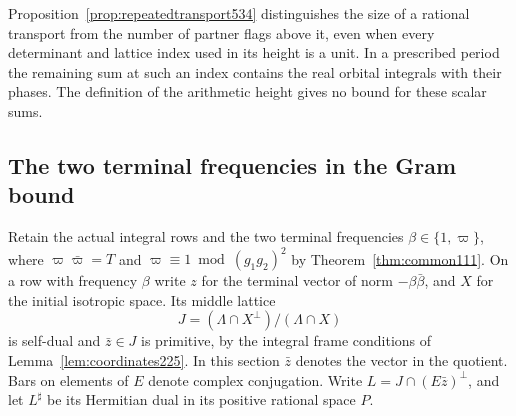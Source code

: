 \documentclass[a4paper,11pt]{article}
\theoremstyle{definition}
\theoremstyle{remark}
\numberwithin{equation}{section}
\begin{document}
Proposition~\ref{prop:repeatedtransport534} distinguishes the
size of a rational transport from the number of partner flags
above it, even when every determinant and lattice index used
in its height is a unit. In a prescribed period the remaining
sum at such an index contains the real orbital integrals with
their phases. The definition of the arithmetic height gives
no bound for these scalar sums.


\subsection{The two terminal frequencies in the Gram bound}
\label{sec:mixedgram535}

Retain the actual integral rows and the two terminal frequencies
\(\beta\in\{1,\varpi\}\), where
\(\varpi\bar\varpi=T\) and \(\varpi\equiv1\bmod (g_1g_2)^2\)
by Theorem~\ref{thm:common111}. On a row with frequency \(\beta\)
write \(z\) for the terminal vector of norm \(-\beta\bar\beta\),
and \(X\) for the initial isotropic space. Its middle lattice
\[
    J=(\Lambda\cap X^\perp)/(\Lambda\cap X)
\]
is self-dual and \(\bar z\in J\) is primitive, by the integral
frame conditions of Lemma~\ref{lem:coordinates225}. In this
section \(\bar z\) denotes the vector in the quotient. Bars on
elements of \(E\) denote complex conjugation. Write
\(L=J\cap (E\bar z)^\perp\), and let \(L^\sharp\) be its
Hermitian dual in its positive rational space \(P\).
\end{document}
